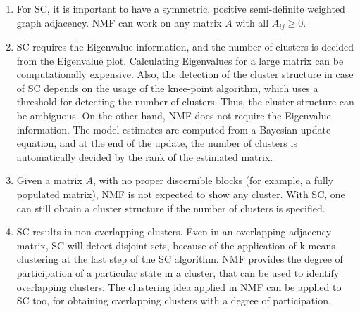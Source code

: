 \begin{enumerate}
\item  For SC, it is important to have a symmetric, positive semi-definite weighted graph adjacency. NMF can work on any matrix $A$ with all $A_{ij} \ge 0$.
\item  SC requires the Eigenvalue information, and the number of clusters is decided from the Eigenvalue plot. Calculating Eigenvalues for a large matrix can be computationally expensive. Also, the detection of the cluster structure in case of SC depends on the usage of the knee-point algorithm, which uses a threshold for detecting the number of clusters. Thus, the cluster structure can be ambiguous. On the other hand, NMF does not require the Eigenvalue information. The model estimates are computed from a Bayesian update equation, and at the end of the update, the number of clusters is automatically decided by the rank of the estimated matrix.
\item Given a matrix $A$, with no proper discernible blocks (for example, a fully populated matrix), NMF is not expected to show any cluster. With SC, one can still obtain a cluster structure if the number of clusters is specified. 
\item SC results in non-overlapping clusters. Even in an overlapping adjacency matrix, SC will detect disjoint sets, because of the application of k-means clustering at the last step of the SC algorithm. NMF provides the degree of participation of a particular state in a cluster, that can be used to identify overlapping clusters. The clustering idea applied in NMF can be applied to SC too, for obtaining overlapping clusters with a degree of participation. 
\end{enumerate}








